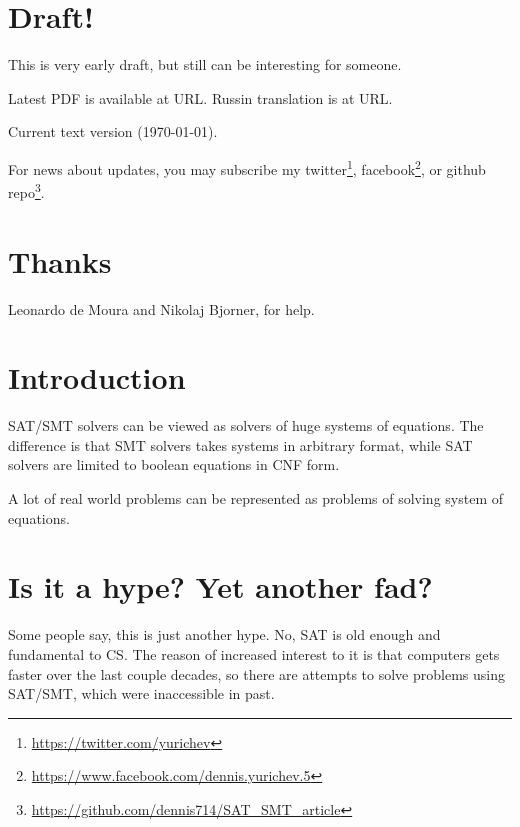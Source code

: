 
\section{Draft!}

This is very early draft, but still can be interesting for someone.

Latest PDF is available at URL.
Russin translation is at URL.

Current text version ({\large \today}).

For news about updates, you may subscribe my 
twitter\footnote{\url{https://twitter.com/yurichev}}, 
facebook\footnote{\url{https://www.facebook.com/dennis.yurichev.5}}, 
or github repo\footnote{\url{https://github.com/dennis714/SAT_SMT_article}}.

\section{Thanks}

Leonardo de Moura and Nikolaj Bjorner, for help.

\section{Introduction}

\ac{SAT}/\ac{SMT} solvers can be viewed as solvers of huge systems of equations.
The difference is that \ac{SMT} solvers takes systems in arbitrary format,
while \ac{SAT} solvers are limited to boolean equations in \ac{CNF} form.

A lot of real world problems can be represented as problems of solving system of equations.

\section{Is it a hype? Yet another fad?}

Some people say, this is just another hype.
No, \ac{SAT} is old enough and fundamental to \ac{CS}.
The reason of increased interest to it is that computers gets faster over the last couple decades,
so there are attempts to solve problems using \ac{SAT}/\ac{SMT}, which were inaccessible in past.

